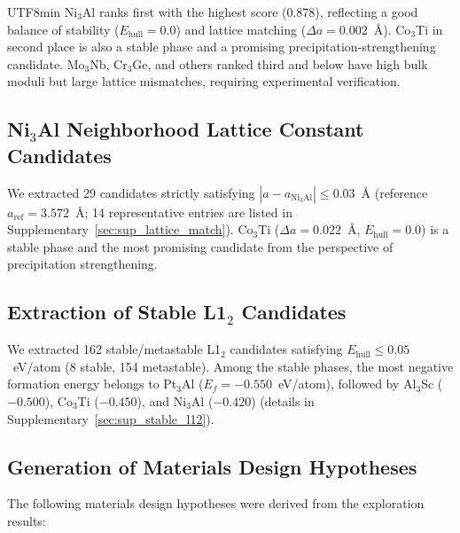\documentclass[sn-mathphys,Numbered]{sn-jnl}
\begin{document}
\begin{CJK}{UTF8}{min}
Ni$_3$Al ranks first with the highest score (0.878), reflecting
a good balance of stability ($E_\text{hull} = 0.0$) and lattice
matching ($\Delta a = 0.002$~\AA).
Co$_3$Ti in second place is also a stable phase and a promising
precipitation-strengthening candidate.
Mo$_3$Nb, Cr$_3$Ge, and others ranked third and below have high
bulk moduli but large lattice mismatches, requiring experimental
verification.

\subsection{Ni$_3$Al Neighborhood Lattice Constant Candidates}
\label{sec:ni3al_lattice}

We extracted 29 candidates strictly satisfying
$|a - a_{\text{Ni}_3\text{Al}}| \leq 0.03$~\AA
(reference $a_{\text{ref}} = 3.572$~\AA; 14 representative
entries are listed in Supplementary~\ref{sec:sup_lattice_match}).
Co$_3$Ti ($\Delta a = 0.022$~\AA, $E_\text{hull} = 0.0$) is a
stable phase and the most promising candidate from the
perspective of precipitation strengthening.

\subsection{Extraction of Stable L1$_2$ Candidates}
\label{sec:stable_l12}

We extracted 162 stable/metastable L1$_2$ candidates satisfying
$E_\text{hull} \leq 0.05$~eV/atom (8 stable, 154 metastable).
Among the stable phases, the most negative formation energy belongs
to Pt$_3$Al ($E_f = -0.550$~eV/atom), followed by
Al$_3$Sc ($-0.500$), Co$_3$Ti ($-0.450$), and
Ni$_3$Al ($-0.420$)
(details in Supplementary~\ref{sec:sup_stable_l12}).

\subsection{Generation of Materials Design Hypotheses}

The following materials design hypotheses were derived from the
exploration results:


\end{CJK}
\end{document}
